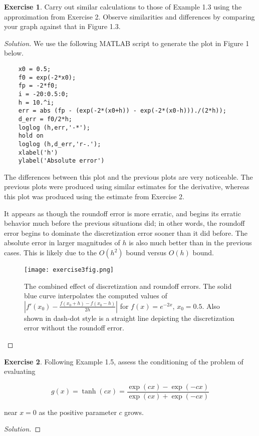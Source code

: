 \documentclass[12pt,a4]{article}
\theoremstyle{definition}
\newtheorem{exercise}{Exercise}
\begin{document}
\begin{exercise}
	Carry out similar calculations to those of Example 1.3 using the approximation from Exercise 2. Observe similarities and differences by comparing your graph against that in Figure 1.3. 
\end{exercise}
\begin{proof}[Solution]
	We use the following MATLAB script to generate the plot in Figure 1 below. 
	
	\begin{verbatim}
	x0 = 0.5;
	f0 = exp(-2*x0);
	fp = -2*f0;
	i = -20:0.5:0;
	h = 10.^i;
	err = abs (fp - (exp(-2*(x0+h)) - exp(-2*(x0-h)))./(2*h));
	d_err = f0/2*h;
	loglog (h,err,'-*');
	hold on
	loglog (h,d_err,'r-.');
	xlabel('h')
	ylabel('Absolute error')
	\end{verbatim}
	
	\noindent The differences between this plot and the previous plots are very noticeable. The previous plots were produced using similar estimates for the derivative, whereas this plot was produced using the estimate from Exercise 2. 
	
	It appears as though the roundoff error is more erratic, and begins its erratic behavior much before the previous situations did; in other words, the roundoff error begins to dominate the discretization error sooner than it did before. The absolute error in larger magnitudes of $h$ is also much better than in the previous cases. This is likely due to the $O(h^2)$ bound versus $O(h)$ bound.
	
	\begin{figure}[h!]
		\centering
		\texttt{[image: exercise3fig.png]}
		\caption{The combined effect of discretization and roundoff errors.  The solid blue curve interpolates the computed values of $|f'(x_0) - \frac{f(x_0 + h) - f(x_0 - h)}{2h}|$ for $f(x) = e^{-2 x}$, $x_0 = 0.5$. Also shown in dash-dot style is a straight line depicting the discretization error without the roundoff error.}
	\end{figure}
	
\end{proof}

\begin{exercise}
	Following Example 1.5, assess the conditioning of the problem of evaluating
	
	\[
	g(x) = \tanh(c x) = \frac{\exp(c x) - \exp(- c x)}{\exp(c x) + \exp(- c x)} 
	\]
	
	\noindent near $x = 0$ as the positive parameter $c$ grows.
\end{exercise}
\begin{proof}[Solution]
	
\end{proof}
\end{document}
